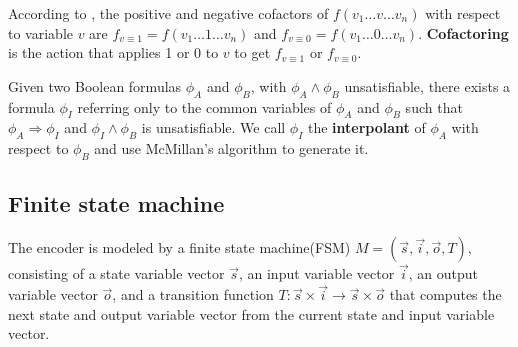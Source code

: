 \documentclass[runningheads,a4paper,orivec]{llncs}
\begin{document}
According to \cite{EFFSATUSMCCO},
the positive and negative cofactors of $f(v_1\dots v\dots v_n)$ with respect to variable
$v$ are $f_{v\equiv 1}=f(v_1\dots 1\dots v_n)$ and $f_{v\equiv 0}=f(v_1\dots 0\dots v_n)$.
\textbf{Cofactoring} is the action that applies 1 or 0 to $v$ to get $f_{v\equiv 1}$ or $f_{v\equiv 0}$.

Given two Boolean formulas $\phi_A$ and $\phi_B$,
with $\phi_A\wedge \phi_B$ unsatisfiable,
there exists a formula $\phi_I$ referring only
to the common variables of $\phi_A$ and $\phi_B$ such that $\phi_A\Rightarrow \phi_I$
and $\phi_I\wedge \phi_B$ is unsatisfiable.
We call $\phi_I$ the \textbf{interpolant} \cite{Craig} of $\phi_A$ with respect to $\phi_B$
and use McMillan's algorithm \cite{interp_McMillan} to generate it.




\subsection{Finite state machine}\label{subsec_fsm}



The encoder is modeled by a finite state machine(FSM) $M=(\vec{s},\vec{i},\vec{o},T)$,
consisting of a state variable vector $\vec{s}$,
an input variable vector $\vec{i}$,
an output variable vector $\vec{o}$,
and a transition function $T: \vec{s}\times \vec{i}\to \vec{s}\times \vec{o}$ 
that computes the next state and output variable vector from the current state and input variable vector.
\end{document}
